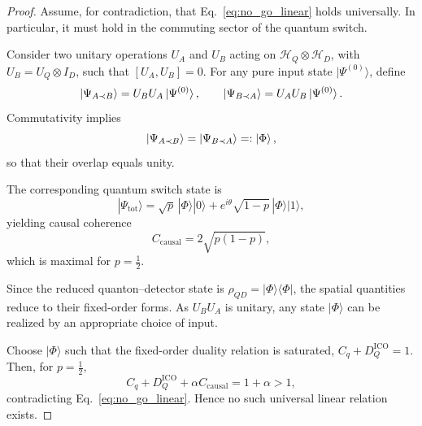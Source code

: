 \documentclass[10pt,a4paper]{amsart}
\begin{document}
\begin{proof}
Assume, for contradiction, that Eq.~\eqref{eq:no_go_linear} holds universally. In particular, it must hold in the commuting sector of the quantum switch.

Consider two unitary operations $U_A$ and $U_B$ acting on $\mathcal{H}_Q \otimes \mathcal{H}_D$, with $U_B = U_Q \otimes I_D$, such that $[U_A,U_B]=0$. For any pure input state $|\Psi^{(0)}\rangle$, define
\[
\ket{\Psi_{A\prec B}} = U_B U_A \ket{\Psi^{(0)}}, 
\qquad
\ket{\Psi_{B\prec A}} = U_A U_B \ket{\Psi^{(0)}}.
\]
Commutativity implies
\[
\ket{\Psi_{A\prec B}} = \ket{\Psi_{B\prec A}} =: \ket{\Phi},
\]
so that their overlap equals unity.

The corresponding quantum switch state is
\[
|\Psi_{\mathrm{tot}}\rangle
=
\sqrt{p}\,|\Phi\rangle|0\rangle
+
e^{i\theta}\sqrt{1-p}\,|\Phi\rangle|1\rangle,
\]
yielding causal coherence
\[
C_{\mathrm{causal}} = 2\sqrt{p(1-p)},
\]
which is maximal for $p=\tfrac12$.

Since the reduced quanton--detector state is $\rho_{QD}=|\Phi\rangle\langle\Phi|$, the spatial quantities reduce to their fixed-order forms. As $U_B U_A$ is unitary, any state $|\Phi\rangle$ can be realized by an appropriate choice of input.

Choose $|\Phi\rangle$ such that the fixed-order duality relation is saturated, $C_q + D_Q^{\mathrm{ICO}} = 1$. Then, for $p=\tfrac12$,
\[
C_q + D_Q^{\mathrm{ICO}} + \alpha C_{\mathrm{causal}} = 1 + \alpha > 1,
\]
contradicting Eq.~\eqref{eq:no_go_linear}. Hence no such universal linear relation exists.
\end{proof}
\end{document}
